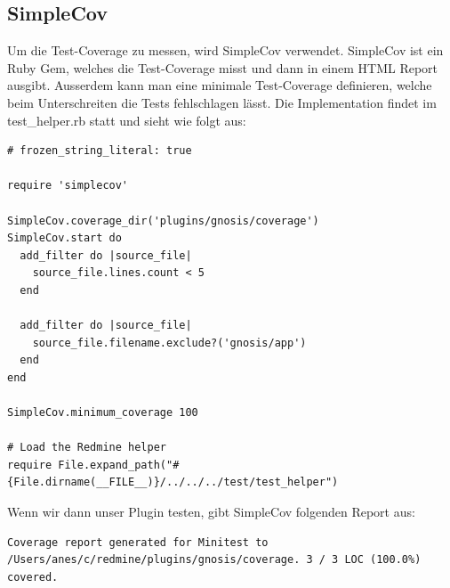 \begin{minipage}{\textwidth}
  \subsection{SimpleCov}
  Um die Test-Coverage zu messen, wird SimpleCov verwendet. SimpleCov ist ein Ruby Gem, welches die Test-Coverage misst und
  dann in einem HTML Report ausgibt. Ausserdem kann man eine minimale Test-Coverage definieren, welche beim Unterschreiten
  die Tests fehlschlagen lässt. \newline
  Die Implementation findet im test\_helper.rb statt und sieht wie folgt aus:
  \begin{codebox}[]
    \begin{verbatim}
# frozen_string_literal: true

require 'simplecov'

SimpleCov.coverage_dir('plugins/gnosis/coverage')
SimpleCov.start do
  add_filter do |source_file|
    source_file.lines.count < 5
  end

  add_filter do |source_file|
    source_file.filename.exclude?('gnosis/app')
  end
end

SimpleCov.minimum_coverage 100

# Load the Redmine helper
require File.expand_path("#{File.dirname(__FILE__)}/../../../test/test_helper")
    \end{verbatim}
  \end{codebox}

  Wenn wir dann unser Plugin testen, gibt SimpleCov folgenden Report aus:
  \begin{codebox}
    \begin{verbatim}
Coverage report generated for Minitest to /Users/anes/c/redmine/plugins/gnosis/coverage. 3 / 3 LOC (100.0%) covered.
    \end{verbatim}
  \end{codebox}
\end{minipage}

